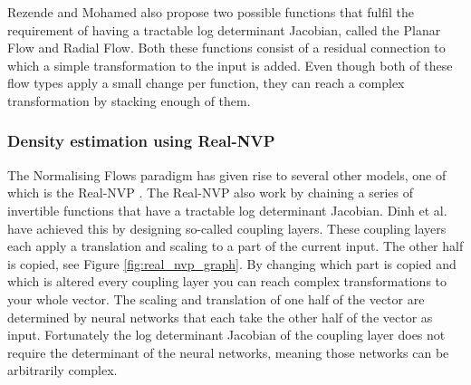\documentclass{article}
\newcommand{\bx}{\mathbf{x}}
\newcommand{\bz}{\mathbf{z}}
\begin{document}
\noindent
Rezende and Mohamed also propose two possible functions that fulfil the requirement of having a tractable log determinant Jacobian, called the Planar Flow and Radial Flow. Both these functions consist of a residual connection to which a simple transformation to the input is added. Even though both of these flow types apply a small change per function, they can reach a complex transformation by stacking enough of them.



\subsubsection*{Density estimation using Real-NVP}
The Normalising Flows paradigm has given rise to several other models, one of which is the Real-NVP \cite{dinh2016density}. The Real-NVP also work by chaining a series of invertible functions that have a tractable log determinant Jacobian. Dinh et al. have achieved this by designing so-called coupling layers. These coupling layers each apply a translation and scaling to a part of the current input. The other half is copied, see Figure \ref{fig:real_nvp_graph}. By changing which part is copied and which is altered every coupling layer you can reach complex transformations to your whole vector. The scaling and translation of one half of the vector are determined by neural networks that each take the other half of the vector as input. Fortunately the log determinant Jacobian of the coupling layer does not require the determinant of the neural networks, meaning those networks can be arbitrarily complex.
\end{document}
